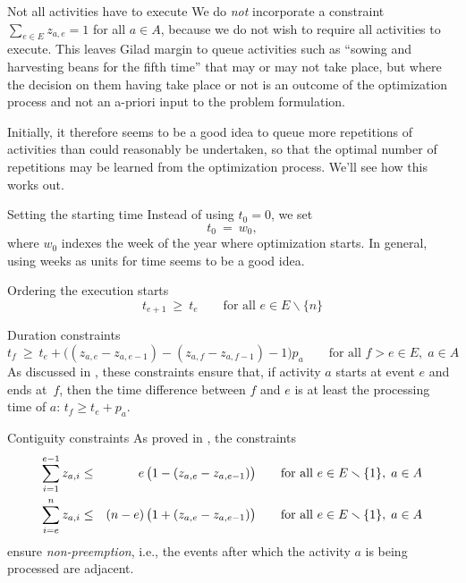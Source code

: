 \documentclass[11pt,reqno]{amsart}
\numberwithin{equation}{section}
\begin{document}
\begin{mydesc}

\item[Not all activities have to execute] We do \emph{not} incorporate a constraint
  $\sum_{e\in E} z_{a,e}=1$ for all $a\in A$, because we do not wish to require all
  activities to execute. This leaves Gilad margin to queue activities such as ``sowing and
  harvesting beans for the fifth time'' that may or may not take place, but where the
  decision on them having take place or not is an outcome of the optimization process and
  not an a-priori input to the problem formulation.

  Initially, it therefore seems to be a good idea to queue more repetitions of activities
  than could reasonably be undertaken, so that the optimal number of repetitions may be
  learned from the optimization process. We'll see how this works out.

\item[Setting the starting time] Instead of using $t_0=0$, we set
  \begin{equation}
     t_0
     \ = \
     w_0,
  \end{equation}
  where $w_0$ indexes the week of the year where optimization starts. In general, using
  weeks as units for time seems to be a good idea.

\item[Ordering the execution starts]
  \begin{equation}
     t_{e+1} 
     \ \ge \
     t_e
     \qquad\text{for all }
      e\in E\smallsetminus\{n\}
  \end{equation}

\item[Duration constraints]
  \begin{equation}
     t_f 
     \ \ge \
     t_e + \big((z_{a,e} - z_{a,e-1} ) - (z_{a,f} - z_{a,f-1}) - 1\big) p_a
     \qquad\text{for all } f>e\in E,\; a\in A
  \end{equation}
  As discussed in \cite{artigues-etal11}, these constraints ensure that,
if activity $a$ starts at event $e$ and ends at~$f$, then the time difference between  $f$
and $e$ is at least the processing time of $a$: $t_f \ge t_e + p_a$.

\item[Contiguity constraints] As proved in \cite[Proposition 1]{artigues-etal11a}, the
  constraints
  \begin{eqnarray}
    \sum_{i=1}^{e-1} z_{a,i}
    &\le&
    \phantom{(n-e)}\llap{$e$}\,\big(1-(z_{a,e} - z_{a,e-1})\big)
    \qquad\text{for all } e\in E\smallsetminus\{1\},\; a\in A
    \\
    \sum_{i=e}^n z_{a,i}
    &\le&
    (n-e)\,\big(1+(z_{a,e} - z_{a,e-1})\big)
    \qquad\text{for all } e\in E\smallsetminus\{1\},\; a\in A
  \end{eqnarray}
  ensure \emph{non-preemption}, i.e., the events after which the activity $a$ is being
  processed are adjacent.


\end{mydesc}
\end{document}
